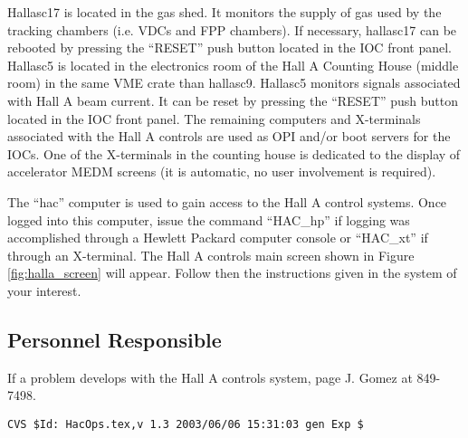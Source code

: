 Hallasc17 is located in the gas shed.
It monitors the supply of gas used by the tracking chambers (i.e. VDCs and FPP chambers).
If necessary, hallasc17 can be rebooted by pressing the ``RESET'' push button located in the IOC front panel.
Hallasc5 is located in the electronics room of the Hall A Counting House (middle room) in the same VME crate than hallasc9.
Hallasc5 monitors signals associated with Hall A beam current. It can be reset by pressing the ``RESET'' push button located in the
IOC front panel. The remaining computers and X-terminals associated with the Hall A controls are used as OPI and/or boot servers for the
IOCs. One of the X-terminals in the counting house is dedicated to the display of accelerator MEDM screens 
(it is automatic, no user involvement is required).

The ``hac'' computer is used to gain access to the Hall A control systems. Once logged into this computer, issue the command ``HAC\_hp''
if logging was accomplished through a Hewlett Packard computer console or ``HAC\_xt'' if through an X-terminal.
The Hall A controls main screen shown in Figure \ref{fig:halla_screen} will appear. Follow then the instructions given in the system of your interest.


\subsection{Personnel Responsible}
If a problem develops with the Hall A controls system, page J. Gomez at 849-7498. 


%
%
%
{\small
\begin{verbatim}CVS $Id: HacOps.tex,v 1.3 2003/06/06 15:31:03 gen Exp $\end{verbatim}
}
